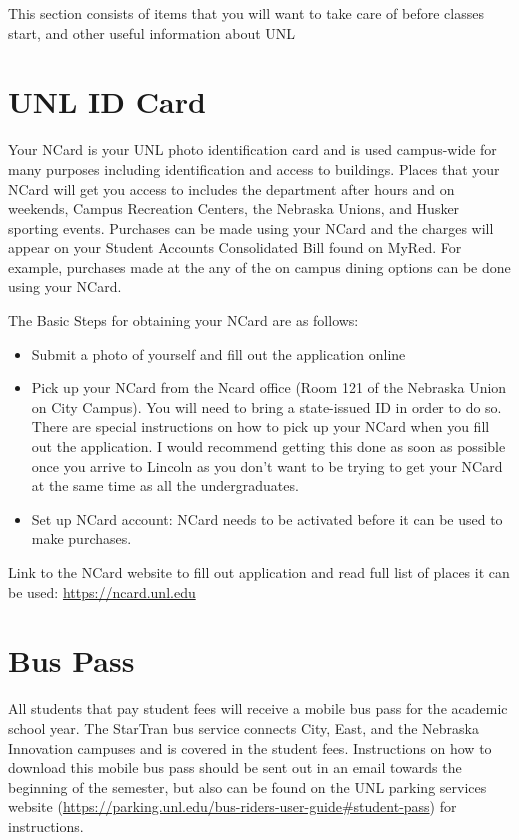 \documentclass[
  12pt,
]{book}
\providecommand{\tightlist}{%
  \setlength{\itemsep}{0pt}\setlength{\parskip}{0pt}}
\begin{document}
This section consists of items that you will want to take care of before classes start, and other useful information about UNL

\hypertarget{unl-id-card}{%
\section{UNL ID Card}\label{unl-id-card}}

Your NCard is your UNL photo identification card and is used campus-wide for many purposes including identification and access to buildings. Places that your NCard will get you access to includes the department after hours and on weekends, Campus Recreation Centers, the Nebraska Unions, and Husker sporting events. Purchases can be made using your NCard and the charges will appear on your Student Accounts Consolidated Bill found on MyRed. For example, purchases made at the any of the on campus dining options can be done using your NCard.

The Basic Steps for obtaining your NCard are as follows:

\begin{itemize}
\tightlist
\item
  Submit a photo of yourself and fill out the application online
\item
  Pick up your NCard from the Ncard office (Room 121 of the Nebraska Union on City Campus). You will need to bring a state-issued ID in order to do so. There are special instructions on how to pick up your NCard when you fill out the application. I would recommend getting this done as soon as possible once you arrive to Lincoln as you don't want to be trying to get your NCard at the same time as all the undergraduates.
\item
  Set up NCard account: NCard needs to be activated before it can be used to make purchases.
\end{itemize}

Link to the NCard website to fill out application and read full list of places it can be used: \url{https://ncard.unl.edu}

\hypertarget{bus-pass}{%
\section{Bus Pass}\label{bus-pass}}

All students that pay student fees will receive a mobile bus pass for the academic school year. The StarTran bus service connects City, East, and the Nebraska Innovation campuses and is covered in the student fees. Instructions on how to download this mobile bus pass should be sent out in an email towards the beginning of the semester, but also can be found on the UNL parking services website (\url{https://parking.unl.edu/bus-riders-user-guide\#student-pass}) for instructions.
\end{document}
